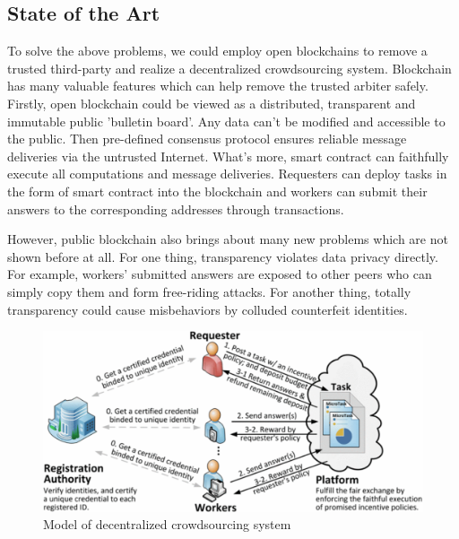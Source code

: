 \documentclass[conference]{IEEEtran}
\begin{document}
\subsection{State of the Art}
To solve the above problems, we could employ open blockchains to remove a trusted third-party and realize a decentralized crowdsourcing system.
%
Blockchain has many valuable features which can help remove the trusted arbiter safely. 
%
Firstly, open blockchain could be viewed as a distributed, transparent and immutable public 'bulletin board'.
%
Any data can't be modified and accessible to the public.
%
Then pre-defined consensus protocol ensures reliable message deliveries via the untrusted Internet. 
%
What's more, smart contract can faithfully execute all computations and message deliveries.
%
Requesters can deploy tasks in the form of smart contract into the blockchain and workers can submit their answers to the corresponding addresses through transactions.

However, public blockchain also brings about many new problems which are not shown before at all.
%
For one thing, transparency violates data privacy directly.
%
For example, workers' submitted answers are exposed to other peers who can simply copy them and form free-riding attacks.
%
For another thing, totally transparency could cause misbehaviors by colluded counterfeit identities.

\begin{figure}[ht]
    \centering
    \includegraphics[width= 0.95\linewidth]{fig/system1.pdf}
    \caption{Model of decentralized crowdsourcing system}
    \label{arch}
\end{figure}
\end{document}
